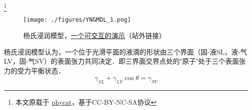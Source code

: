 
\begin{issues}
\issueDraft
\end{issues}

\footnote{本文原载于 \href{https://www.phycat.cn/archives/230/}{phycat}，基于CC-BY-NC-SA协议}

\begin{figure}[ht]
\centering
\texttt{[image: ./figures/YNGMDL\_1.png]}
\caption{杨氏浸润模型，\href{https://www.phycat.cn/archives/230/}{一个可交互的演示}（站外链接）} \label{YNGMDL_fig1}
\end{figure}
杨氏浸润模型认为，一个位于光滑平面的液滴的形状由三个界面（固-液SL，液-气LV，固-气SV）的表面张力共同决定．即三界面交界点处的"原子"处于三个表面张力的受力平衡状态．
\begin{equation}
\gamma_{SL}+\gamma_{LV}\cos\theta=\gamma_{SV}
\end{equation}
